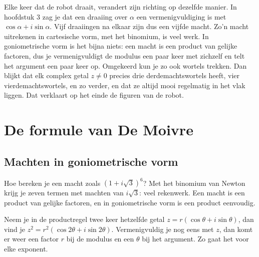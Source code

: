 Elke keer dat de robot draait, verandert zijn richting op dezelfde manier. In hoofdstuk 3 zag je dat een draaiing over $\alpha$ een vermenigvuldiging is met $\cos\alpha + i\sin\alpha$. Vijf draaiingen na elkaar zijn dus een vijfde macht. Zo'n macht uitrekenen in cartesische vorm, met het binomium, is veel werk. In goniometrische vorm is het bijna niets: een macht is een product van gelijke factoren, dus je vermenigvuldigt de modulus een paar keer met zichzelf en telt het argument een paar keer op. Omgekeerd kun je zo ook wortels trekken. Dan blijkt dat elk complex getal $z \neq 0$ precies drie derdemachtswortels heeft, vier vierdemachtswortels, en zo verder, en dat ze altijd mooi regelmatig in het vlak liggen. Dat verklaart op het einde de figuren van de robot.

\begin{oefeningen}[Start]

\end{oefeningen}


\section{De formule van De Moivre}

\subsection{Machten in goniometrische vorm}

Hoe bereken je een macht zoals $(1 + i\sqrt3)^6$? Met het binomium van Newton krijg je zeven termen met machten van $i\sqrt3$: veel rekenwerk. Een macht is een product van gelijke factoren, en in goniometrische vorm is een product eenvoudig.

Neem je in de productregel twee keer hetzelfde getal $z = r(\cos\theta + i\sin\theta)$, dan vind je $z^2 = r^2(\cos 2\theta + i\sin 2\theta)$. Vermenigvuldig je nog eens met $z$, dan komt er weer een factor $r$ bij de modulus en een $\theta$ bij het argument. Zo gaat het voor elke exponent.

